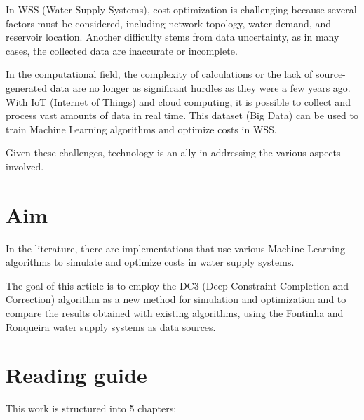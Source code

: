 In WSS (Water Supply Systems), cost optimization is challenging because several factors must be considered, including network topology, water demand, and reservoir location. Another difficulty stems from data uncertainty, as in many cases, the collected data are inaccurate or incomplete.

In the computational field, the complexity of calculations or the lack of source-generated data are no longer as significant hurdles as they were a few years ago. With IoT (Internet of Things) and cloud computing, it is possible to collect and process vast amounts of data in real time. This dataset (Big Data) can be used to train Machine Learning algorithms and optimize costs in WSS.

Given these challenges, technology is an ally in addressing the various aspects involved.

\section{Aim}

\begin{comment}
Na literatura, encontram-se implementações no uso de diversos algoritmos de Machine Learning para simular e otimizar custos de sistemas de abastecimento de água.

A proposta do presente artigos é utilizar o algoritmo DC3 (Deep Constraint Completion and Correction), como forma de apresentar um novo método para simulação e otimização e comparar os resultados obtidos com os algoritmos já existentes, utilizando como fontes de dados os sistemas de abastecimento de água de Fontinha e Ronqueira.
    
\end{comment}


In the literature, there are implementations that use various Machine Learning algorithms to simulate and optimize costs in water supply systems.

The goal of this article is to employ the DC3 (Deep Constraint Completion and Correction) algorithm as a new method for simulation and optimization and to compare the results obtained with existing algorithms, using the Fontinha and Ronqueira water supply systems as data sources.

\section{Reading guide}
This work is structured into 5 chapters:

